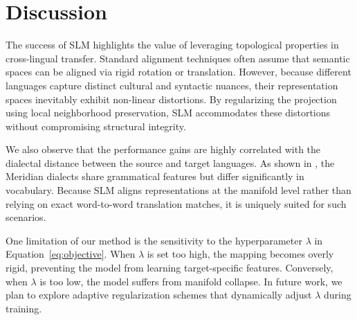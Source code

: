 \section{Discussion}
The success of SLM highlights the value of leveraging topological properties in cross-lingual transfer. Standard alignment techniques often assume that semantic spaces can be aligned via rigid rotation or translation. However, because different languages capture distinct cultural and syntactic nuances, their representation spaces inevitably exhibit non-linear distortions. By regularizing the projection using local neighborhood preservation, SLM accommodates these distortions without compromising structural integrity.

We also observe that the performance gains are highly correlated with the dialectal distance between the source and target languages. As shown in \citet{roberts2022meridian}, the Meridian dialects share grammatical features but differ significantly in vocabulary. Because SLM aligns representations at the manifold level rather than relying on exact word-to-word translation matches, it is uniquely suited for such scenarios.

One limitation of our method is the sensitivity to the hyperparameter $\lambda$ in Equation~\ref{eq:objective}. When $\lambda$ is set too high, the mapping becomes overly rigid, preventing the model from learning target-specific features. Conversely, when $\lambda$ is too low, the model suffers from manifold collapse. In future work, we plan to explore adaptive regularization schemes that dynamically adjust $\lambda$ during training.
